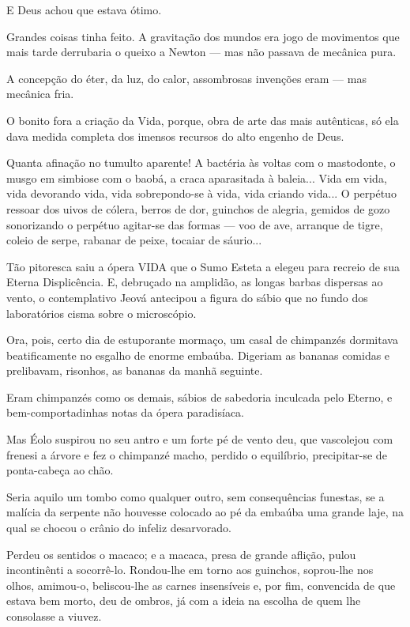 E Deus achou que estava ótimo.

Grandes coisas tinha feito. A gravitação dos mundos era jogo de
movimentos que mais tarde derrubaria o queixo a Newton --- mas não
passava de mecânica pura.

A concepção do éter, da luz, do calor, assombrosas invenções eram ---
mas mecânica fria.

O bonito fora a criação da Vida, porque, obra de arte das mais
autênticas, só ela dava medida completa dos imensos recursos do alto
engenho de Deus.

Quanta afinação no tumulto aparente! A bactéria às voltas com o
mastodonte, o musgo em simbiose com o baobá, a craca aparasitada à
baleia... Vida em vida, vida devorando vida, vida sobrepondo-se à vida,
vida criando vida... O perpétuo ressoar dos uivos de cólera, berros de
dor, guinchos de alegria, gemidos de gozo sonorizando o perpétuo
agitar-se das formas --- voo de ave, arranque de tigre, coleio de serpe,
rabanar de peixe, tocaiar de sáurio...

Tão pitoresca saiu a ópera VIDA que o Sumo Esteta a elegeu para recreio
de sua Eterna Displicência. E, debruçado na amplidão, as longas barbas
dispersas ao vento, o contemplativo Jeová antecipou a figura do sábio
que no fundo dos laboratórios cisma sobre o microscópio.

Ora, pois, certo dia de estuporante mormaço, um casal de chimpanzés
dormitava beatificamente no esgalho de enorme embaúba. Digeriam as
bananas comidas e prelibavam, risonhos, as bananas da manhã seguinte.

Eram chimpanzés como os demais, sábios de sabedoria inculcada pelo
Eterno, e bem-comportadinhas notas da ópera paradisíaca.

Mas Éolo suspirou no seu antro e um forte pé de vento deu, que
vascolejou com frenesi a árvore e fez o chimpanzé macho, perdido o
equilíbrio, precipitar-se de ponta-cabeça ao chão.

Seria aquilo um tombo como qualquer outro, sem consequências funestas,
se a malícia da serpente não houvesse colocado ao pé da embaúba uma
grande laje, na qual se chocou o crânio do infeliz desarvorado.

Perdeu os sentidos o macaco; e a macaca, presa de grande aflição, pulou
incontinênti a socorrê-lo. Rondou-lhe em torno aos guinchos, soprou-lhe
nos olhos, amimou-o, beliscou-lhe as carnes insensíveis e, por fim,
convencida de que estava bem morto, deu de ombros, já com a ideia na
escolha de quem lhe consolasse a viuvez.

